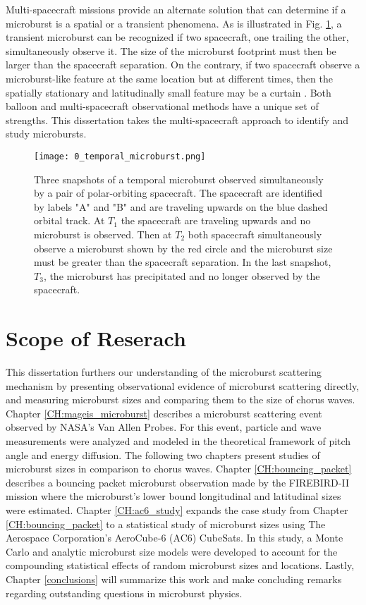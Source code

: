 Multi-spacecraft missions provide an alternate solution that can determine if a microburst is a spatial or a transient phenomena. As is illustrated in Fig. \ref{Intro:temporal_microburst}, a transient microburst can be recognized if two spacecraft, one trailing the other, simultaneously observe it. The size of the microburst footprint must then be larger than the spacecraft separation. On the contrary, if two spacecraft observe a microburst-like feature at the same location but at different times, then the spatially stationary and latitudinally small feature may be a curtain \citep{Blake2016}. Both balloon and multi-spacecraft observational methods have a unique set of strengths. This dissertation takes the multi-spacecraft approach to identify and study microbursts.

\begin{figure}
\texttt{[image: 0\_temporal\_microburst.png]}
\caption{Three snapshots of a temporal microburst observed simultaneously by a pair of polar-orbiting spacecraft. The spacecraft are identified by labels "A" and "B" and are traveling upwards on the blue dashed orbital track. At $T_1$ the spacecraft are traveling upwards and no microburst is observed. Then at $T_2$ both spacecraft simultaneously observe a microburst shown by the red circle and the microburst size must be greater than the spacecraft separation. In the last snapshot, $T_3$, the microburst has precipitated and no longer observed by the spacecraft.}
\label{Intro:temporal_microburst}
\end{figure}


\section{Scope of Reserach}\label{Intro:scope}
This dissertation furthers our understanding of the microburst scattering mechanism by presenting observational evidence of microburst scattering directly, and measuring microburst sizes and comparing them to the size of chorus waves. Chapter \ref{CH:mageis_microburst} describes a microburst scattering event observed by NASA's Van Allen Probes. For this event, particle and wave measurements were analyzed and modeled in the theoretical framework of pitch angle and energy diffusion. The following two chapters present studies of microburst sizes in comparison to chorus waves. Chapter \ref{CH:bouncing_packet} describes a bouncing packet microburst observation made by the FIREBIRD-II mission where the microburst's lower bound longitudinal and latitudinal sizes were estimated. Chapter \ref{CH:ac6_study} expands the case study from Chapter \ref{CH:bouncing_packet} to a statistical study of microburst sizes using The Aerospace Corporation's AeroCube-6 (AC6) CubeSats. In this study, a Monte Carlo and analytic microburst size models were developed to account for the compounding statistical effects of random microburst sizes and locations. Lastly, Chapter \ref{conclusions} will summarize this work and make concluding remarks regarding outstanding questions in microburst physics.